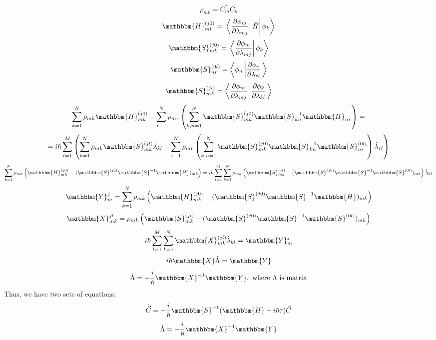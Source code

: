 $$\rho_{mk} = C_m^*C_k$$
$$\mathbbm{H}_{ml}^{(j0)}=\left.\left.\left\langle\frac{\partial\phi_m}{\partial\lambda_{mj}}\right|\hat{H}\right|\phi_k\right\rangle$$
$$\mathbbm{S}_{mk}^{(j0)}=\left.\left\langle\frac{\partial\phi_m}{\partial\lambda_{mj}}\right|\phi_k\right\rangle$$
$$\mathbbm{S}_{nr}^{(0l)}=\left\langle\phi_n\left|\frac{\partial\phi_r}{\partial\lambda_{rl}}\right.\right\rangle$$
$$\mathbbm{S}_{mk}^{(jl)}=\left\langle\frac{\partial\phi_m}{\partial\lambda_{mj}}\left|%
				 \frac{\partial\phi_k}{\partial\lambda_{kl}}\right.\right\rangle$$
$$\sum_{k=1}^N\rho_{mk}\mathbbm{H}_{mk}^{(j0)}-%
  \sum_{r=1}^N\rho_{mr}\left(\sum_{k,n=1}^N\mathbbm{S}_{mk}^{(j0)}\mathbbm{S}_{kn}^{-1}\mathbbm{H}_{nr}\right)=$$
$$=i\hbar\sum_{l=1}^M\left(\sum_{k=1}^N\rho_{mk}\mathbbm{S}_{mk}^{(jl)}\dot{\lambda}_{kl}-%
\sum_{r=1}^N\rho_{mr}\left(\sum_{k,n=1}^{N}\mathbbm{S}_{mk}^{(j0)}\mathbbm{S}_{kn}^{-1}\mathbbm{S}_{nr}^{(0l)}\right)\dot{\lambda}_{rl}\right)$$
$$\sum_{k=1}^N\rho_{mk}\left(\mathbbm{H}_{mk}^{(j0)}-%
	                     (\mathbbm{S}^{(j0)}\mathbbm{S}^{-1}\mathbbm{H})_{mk} \right)=%
i\hbar\sum_{l=1}^M\sum_{k=1}^N\rho_{mk}\left(\mathbbm{S}_{mk}^{(jl)}-%
					     (\mathbbm{S}^{(j0)}\mathbbm{S}^{-1}\mathbbm{S}^{(0l)})_{mk}\right)\dot{\lambda}_{kl}$$
$$\mathbbm{Y}_{m}^j=\sum_{k=1}^N\rho_{mk}\left(\mathbbm{H}_{mk}^{(j0)}-%
	                     (\mathbbm{S}^{(j0)}\mathbbm{S}^{-1}\mathbbm{H})_{mk} \right)$$
$$\mathbbm{X}_{mk}^{jl}=\rho_{mk}\left(\mathbbm{S}_{mk}^{(jl)}-%
					     (\mathbbm{S}^{(j0)}\mathbbm{S}^{-1}\mathbbm{S}^{(0l)})_{mk}\right)$$
$$i\hbar\sum_{l=1}^M\sum_{k=1}^N\mathbbm{X}_{mk}^{(jl)}\dot{\lambda}_{kl}=\mathbbm{Y}_m^j$$
$$i\hbar\mathbbm{X}\dot{\Lambda}=\mathbbm{Y}$$
$$\dot{\Lambda} = -\frac{i}{\hbar}\mathbbm{X}^{-1}\mathbbm{Y},\text{ where }\Lambda\text{ is matrix}$$
Thus, we have two sets of equations:
$$\dot{\vec{C}} = -\frac{i}{\hbar}\mathbbm{S}^{-1}(\mathbbm{H}-i\hbar\tau)\vec{C}$$
$$\dot{\Lambda} = -\frac{i}{\hbar}\mathbbm{X}^{-1}\mathbbm{Y}$$

